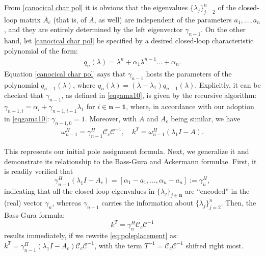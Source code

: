 \documentclass[conference]{IEEEtran}
\newcommand{\acl}{\bar{A}}
\newcommand{\numn}{\boldsymbol{n}}
\newcommand{\numnone}{\boldsymbol{n-1}}
\newcommand{\om}{\omega}
\begin{document}
From \eqref{canocical char pol} it is obvious that the eigenvalues $\{\lambda_j\}_{j=2}^{n}$ of the closed-loop matrix $\acl_{c}$ (that is, of  $\acl$, as well) are independent of the parameters $a_1, \ldots, a_{n}$, and they are entirely determined by the left eigenvector $\gamma_{n-1}$. On the other hand, let \eqref{canocical char pol}  be specified by a desired closed-loop characteristic polynomial of the form:
\begin{align}\label{eq:descp}
q_n(\lambda) = \lambda^{n}+\alpha_1\lambda^{n-1}\ldots+\alpha_{n}.
\end{align}
Equation \eqref{canocical char pol} says that $\gamma_{n-1}$ hosts the parameters of the polynomial $q_{n-1}(\lambda)$, where
$q_{n}(\lambda)=(\lambda-\lambda_1) q_{n-1}(\lambda)$. Explicitly, it
can be checked that $\gamma_{n-1}$, as defined in \eqref{eqgama10}, is given by the recursive algorithm:
$\gamma_{n-1,i} = \alpha_i+ \gamma_{n-1,i-1}\lambda_1$ for $i\in\numnone$,
where, in accordance with our adoption in \eqref{eqgama10}: $\gamma_{n-1,0}=1$. Moreover, with $\acl$ and $\acl_c$ being similar, we have
\begin{align}
\om_{n-1}^H= \gamma_{n-1}^H \mathcal{C}_c \mathcal{C}^{-1},\quad k^T = \om_{n-1}^H (\lambda_1 I -A).
\label{eq:poleplacement}
\end{align}


This represents our initial pole assignment formula. Next, we
generalize it and demonstrate its relationship to the Bass-Gura and
Ackermann formulae. First, it is readily verified that
\vspace{-10pt}
\begin{equation}
\label{eq:bg1}
\gamma_{n-1}^H (\lambda_1 I -A_c) = [\alpha_1-a_1,\ldots,\alpha_n-a_n]:= \gamma_n^H,
\end{equation}
indicating that all the closed-loop eigenvalues in $\{\lambda_j\}_{{j\in\numn}}$ are ``encoded'' in the (real) vector $\gamma_n$, whereas $\gamma_{n-1}$ carries the information about $\{\lambda_j\}_{j=2}^{n}$. Then, the Bass-Gura formula:
\begin{equation}
\label{eq:bassguraformula}
k^T = \gamma^H_n\mathcal{C}_c \mathcal{C}^{-1}
\end{equation}
results immediately, if we rewrite \eqref{eq:poleplacement} as:
$k^T = \gamma_{n-1}^H (\lambda_1 I -A_c) \mathcal{C}_c \mathcal{C}^{-1}$,
with the term $T^{-1}=\mathcal{C}_c \mathcal{C}^{-1}$ shifted right most. 
\end{document}
